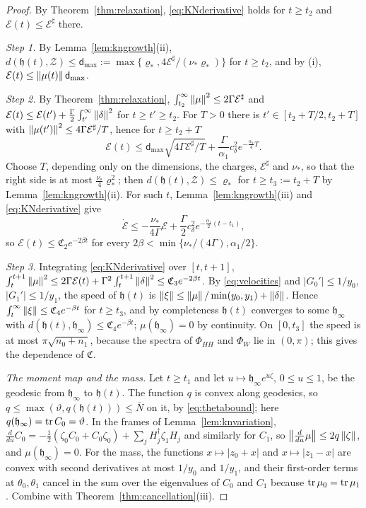 \begin{proof}
By Theorem~\ref{thm:relaxation}, \eqref{eq:KNderivative} holds for
$t\geq t_2$ and $\mathcal E(t)\leq\mathcal E^\sharp$ there.

\emph{Step 1.} By Lemma~\ref{lem:kngrowth}(ii),
$d(\mathfrak h(t),\mathcal Z)\leq\mathsf d_{\max}:=\max\{\varrho_*,4\mathcal E^\sharp/(\nu_*\varrho_*)\}$
for $t\geq t_2$, and by (i), $\mathcal E(t)\leq\left\lVert\mu(t)\right\rVert\mathsf d_{\max}$.

\emph{Step 2.} By Theorem~\ref{thm:relaxation},
$\int_{t_2}^\infty\left\lVert\mu\right\rVert^2\leq2\Gamma\mathcal E^\sharp$ and
$\mathcal E(t)\leq\mathcal E(t')+\frac\Gamma2\int_{t'}^\infty\left\lVert\delta\right\rVert^2$ for
$t\geq t'\geq t_2$. For $T>0$ there is $t'\in[t_2+T/2,t_2+T]$ with
$\left\lVert\mu(t')\right\rVert^2\leq4\Gamma\mathcal E^\sharp/T$, hence for $t\geq t_2+T$
\[
 \mathcal E(t)\leq\mathsf d_{\max}\sqrt{4\Gamma\mathcal E^\sharp/T}
 +\frac\Gamma{\alpha_1}c_\delta^2e^{-\frac{\alpha_1}4T}.
\]
Choose $T$, depending only on the dimensions, the charges,
$\mathcal E^\sharp$ and $\nu_*$, so that the right side is at most
$\frac{\nu_*}4\varrho_*^2$; then $d(\mathfrak h(t),\mathcal Z)\leq\varrho_*$ for
$t\geq t_3:=t_2+T$ by Lemma~\ref{lem:kngrowth}(ii). For such $t$,
Lemma~\ref{lem:kngrowth}(iii) and \eqref{eq:KNderivative} give
\[
 \dot{\mathcal E}\leq-\frac{\nu_*}{4\Gamma}\mathcal E
 +\frac\Gamma2c_\delta^2e^{-\frac{\alpha_1}2(t-t_1)},
\]
so $\mathcal E(t)\leq\mathfrak C_2e^{-2\beta t}$ for every
$2\beta<\min\{\nu_*/(4\Gamma),\alpha_1/2\}$.

\emph{Step 3.} Integrating \eqref{eq:KNderivative} over $[t,t+1]$,
$\int_t^{t+1}\left\lVert\mu\right\rVert^2\leq2\Gamma\mathcal E(t)+\Gamma^2\int_t^{t+1}\left\lVert\delta\right\rVert^2
\leq\mathfrak C_3e^{-2\beta t}$. By \eqref{eq:velocities} and $|G_0'|\leq1/y_0$,
$|G_1'|\leq1/y_1$, the speed of $\mathfrak h(t)$ is
$\left\lVert\xi\right\rVert\leq\left\lVert\mu\right\rVert/\min(y_0,y_1)+\left\lVert\delta\right\rVert$. Hence
$\int_t^\infty\left\lVert\xi\right\rVert\leq\mathfrak C_4e^{-\beta t}$ for $t\geq t_3$, and by
completeness $\mathfrak h(t)$ converges to some $\mathfrak h_\infty$ with
$d(\mathfrak h(t),\mathfrak h_\infty)\leq\mathfrak C_4e^{-\beta t}$; $\mu(\mathfrak h_\infty)=0$ by continuity. On
$[0,t_3]$ the speed is at most $\pi\sqrt{n_0+n_1}$, because the spectra of
$\Phi_{HH}$ and $\Phi_W$ lie in $(0,\pi)$; this gives the dependence of $\mathfrak C$.

\emph{The moment map and the mass.} Let $t\geq t_1$ and let
$u\mapsto \mathfrak h_\infty e^{u\zeta}$, $0\leq u\leq1$, be the geodesic from
$\mathfrak h_\infty$ to $\mathfrak h(t)$. The function $q$ is convex along geodesics, so
$q\leq\max(\vartheta,q(\mathfrak h(t)))\leq\bar N$ on it, by
\eqref{eq:thetabound}; here $q(\mathfrak h_\infty)=\operatorname{tr} C_0=\vartheta$. In the frames of
Lemma~\ref{lem:knvariation},
$\frac d{du}C_0=-\frac12(\zeta_0C_0+C_0\zeta_0)+\sum_jH_j^\dagger\zeta_1H_j$
and similarly for $C_1$, so $\left\lVert\frac d{du}\mu\right\rVert\leq2q\left\lVert\zeta\right\rVert$, and
$\mu(\mathfrak h_\infty)=0$. For the mass, the functions $x\mapsto|z_0+x|$ and
$x\mapsto|z_1-x|$ are convex with second derivatives at most $1/y_0$ and
$1/y_1$, and their first-order terms at $\theta_0,\theta_1$ cancel in the sum
over the eigenvalues of $C_0$ and $C_1$ because $\operatorname{tr}\mu_0=\operatorname{tr}\mu_1$. Combine
with Theorem~\ref{thm:cancellation}(iii).
\end{proof}

